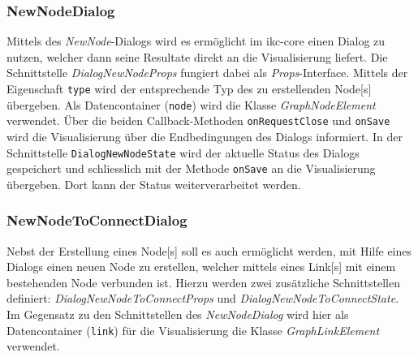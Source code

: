\subsubsection{NewNodeDialog}
Mittels des \textit{NewNode}-Dialogs wird es ermöglicht im \gls{ikc-core} einen Dialog zu nutzen, welcher dann seine Resultate direkt an die Visualisierung liefert. Die Schnittstelle \textit{DialogNewNodeProps} fungiert dabei als \textit{Props}-Interface. Mittels der Eigenschaft \texttt{type} wird der entsprechende Typ des zu erstellenden \gls{Node}[s] übergeben. Als Datencontainer (\texttt{node}) wird die Klasse \textit{GraphNodeElement} verwendet. Über die beiden \gls{Callback}-Methoden \texttt{on\-Request\-Close} und \texttt{onSave} wird die Visualisierung über die Endbedingungen des Dialogs informiert. In der Schnittstelle \texttt{DialogNewNodeState} wird der aktuelle Status des Dialogs gespeichert und schliesslich mit der Methode \texttt{onSave} an die Visualisierung übergeben. Dort kann der Status weiterverarbeitet werden.


\subsubsection{NewNodeToConnectDialog}
\label{NewNodeToConnectDialog}
Nebst der Erstellung eines \gls{Node}[s] soll es auch ermöglicht werden, mit Hilfe eines Dialogs einen neuen \gls{Node} zu erstellen, welcher mittels eines \gls{Link}[s] mit einem bestehenden \gls{Node} verbunden ist. Hierzu werden zwei zusätzliche Schnittstellen definiert: \textit{Dialog\-New\-Node\-To\-Con\-nect\-Props} und \textit{Dialog\-New\-Node\-To\-Con\-nect\-State}. Im Gegensatz zu den Schnittstellen des \textit{NewNodeDialog} wird hier als Datencontainer (\texttt{link}) für die Visualisierung die Klasse \textit{GraphLinkElement} verwendet.


